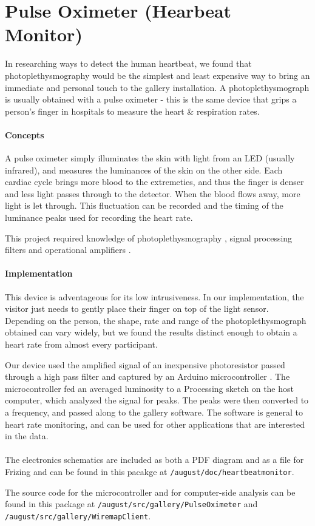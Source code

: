 \section{Pulse Oximeter (Hearbeat Monitor)}
In researching ways to detect the human heartbeat, we found that photoplethysmography would be the simplest and least expensive way to bring an immediate and personal touch to the gallery installation. A photoplethysmograph is usually obtained with a pulse oximeter - this is the same device that grips a person's finger in hospitals to measure the heart \& respiration rates. 

\paragraph{Concepts}
A pulse oximeter simply illuminates the skin with light from an LED (usually infrared), and measures the luminances of the skin on the other side. Each cardiac cycle brings more blood to the extremeties, and thus the finger is denser and less light passes through to the detector. When the blood flows away, more light is let through. This fluctuation can be recorded and the timing of the luminance peaks used for recording the heart rate.

This project required knowledge of photoplethysmography \cite{PO} \cite{EC1}, signal processing filters \cite{EC2} and operational amplifiers \cite{HL} \cite{BK} \cite{BB}.

\paragraph{Implementation}
This device is adventageous for its low intrusiveness. In our implementation, the visitor just needs to gently place their finger on top of the light sensor. Depending on the person, the shape, rate and range of the photoplethysmograph obtained can vary widely, but we found the results distinct enough to obtain a heart rate from almost every participant. 

Our device used the amplified signal of an inexpensive photoresistor passed through a high pass filter and captured by an Arduino microcontroller \cite{ARD}. The microcontroller fed an averaged luminosity to a Processing \cite{P5} sketch on the host computer, which analyzed the signal for peaks. The peaks were then converted to a frequency, and passed along to the gallery software. The software is general to heart rate monitoring, and can be used for other applications that are interested in the data.

\paragraph{}
The electronics schematics are included as both a PDF diagram and as a file for Frizing\cite{FTZ} and can be found in this pacakge at \texttt{/august/doc/heartbeatmonitor}.

The source code for the microcontroller and for computer-side analysis can be found in this package at \texttt{/august/src/gallery/PulseOximeter} and \texttt{/august/src/gallery/WiremapClient}.
